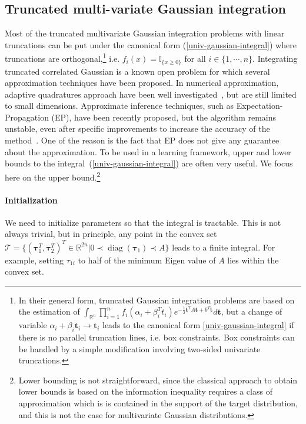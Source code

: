 \documentclass[reqno,oneside,letterpaper,10pt]{article}
\renewcommand{\t}{\mathbf{t}}
\newcommand{\diag}[1]{\mathop{\textrm{diag}}\left(#1\right)}
\newcommand{\tauspace}{\mathcal{T}}
\newcommand{\transp}{^{T}}
\def\Indic#1{\mathbb{I}_{\{#1\}}}
\def\A{A}
\def\btau{{\bm{\tau}}}
\renewcommand{\Re}{\mathbb{R}}
\begin{document}
\subsection{Truncated multi-variate Gaussian integration}
Most of the truncated multivariate Gaussian integration problems with linear
truncations can be put under the canonical form (\ref{univ-gaussian-integral})
where truncations are orthogonal,\footnote{ In their general form, truncated Gaussian integration problems
are based on the estimation of $\int_{\Re^n}  \prod_{i=1}^n f_i(\alpha_i +
\beta_i\transp t_i) e^{-\frac 12 \t\transp \A \t + b\transp \t} d\t$, but a
change of variable $\alpha_i + \beta_i\t_i \rightarrow \t_i$ leads to the
canonical form \eqref{univ-gaussian-integral} if there is no parallel truncation
lines, i.e. box constraints. Box constraints can be handled by a simple
modification involving two-sided univariate truncations. 
}
 i.e.
 $f_i(x)=\Indic{x\ge 0}$ for all $i\in\{1,\cdots,n\}$.
Integrating truncated correlated Gaussian is a known open problem for which
several approximation techniques have been proposed.
In numerical approximation,
adaptive quadratures approach have been well
investigated~\citep{genz2009computation}, but are still limited to small
dimensions. Approximate inference techniques,
such as Expectation-Propagation (EP), have been recently proposed, but the algorithm
remains unstable, even after specific improvements to increase the accuracy of
the method~\citep{Cunningham-et-al-Gaussian-EP2012}.
One of the reason is the fact that EP does not give any guarantee about the
approximation. To be used in a learning framework, upper and lower
bounds to the integral~(\ref{univ-gaussian-integral}) are often very useful. 
We focus here on the upper bound.\footnote{Lower bounding is not straightforward, since the
classical approach to obtain lower bounds is based on the information inequality
requires a class of approximation which is is contained in the support of the
target distribution, and this is not the case for multivariate Gaussian
distributions.} 
%
\paragraph{Initialization}
We need to initialize parameters so that the integral is tractable. This is not always trivial, but in principle, 
any point in the convex set $\tauspace=\{(\btau_1\transp, \btau_2\transp)\transp \in\Re^{2n} | 0\prec\diag{\btau_1}\prec A \}$ leads to a finite integral. For example, setting $\tau_{1i}$ to half of the minimum Eigen value of $A$ lies within the convex set.
\end{document}
